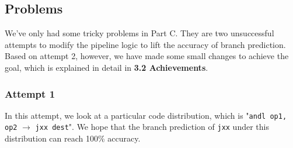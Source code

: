 \documentclass{article}
\begin{document}
\subsection{Problems}
We've only had some tricky problems in Part C. They are two unsuccessful attempts to modify the pipeline logic to lift the accuracy of branch prediction.
Based on attempt 2, however, we have made some small changes to achieve the goal, which is explained in detail in \textbf{3.2 Achievements}.
\subsubsection{Attempt 1}
In this attempt, we look at a particular code distribution, 
which is "\texttt{andl op1, op2} $\rightarrow$ \texttt{jxx dest}". 
We hope that the branch prediction of \texttt{jxx} under this distribution can reach 100\% accuracy.
\end{document}
